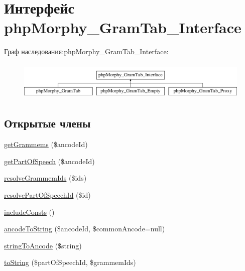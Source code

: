 \hypertarget{interfacephpMorphy__GramTab__Interface}{
\section{Интерфейс phpMorphy\_\-GramTab\_\-Interface}
\label{interfacephpMorphy__GramTab__Interface}
}
Граф наследования:phpMorphy\_\-GramTab\_\-Interface:\begin{figure}[H]
\begin{center}
\leavevmode
\includegraphics[height=1.866667cm]{interfacephpMorphy__GramTab__Interface}
\end{center}
\end{figure}
\subsection*{Открытые члены}
\begin{DoxyCompactItemize}
\item 
\hyperlink{interfacephpMorphy__GramTab__Interface_af2191f54f4a58ea79bd980fc00f2ccaf}{getGrammems} (\$ancodeId)
\item 
\hyperlink{interfacephpMorphy__GramTab__Interface_a8588c3b69fcc065486661ec4a71a6b1c}{getPartOfSpeech} (\$ancodeId)
\item 
\hyperlink{interfacephpMorphy__GramTab__Interface_ab6f68cab39718acf32c4580539d7fa17}{resolveGrammemIds} (\$ids)
\item 
\hyperlink{interfacephpMorphy__GramTab__Interface_a7c440e380d7d26c29951ba5dd2af5256}{resolvePartOfSpeechId} (\$id)
\item 
\hyperlink{interfacephpMorphy__GramTab__Interface_ab1b6b5988b52e4e984f238bf23200469}{includeConsts} ()
\item 
\hyperlink{interfacephpMorphy__GramTab__Interface_a8fce16503f9c28f62a827cdd74b25b36}{ancodeToString} (\$ancodeId, \$commonAncode=null)
\item 
\hyperlink{interfacephpMorphy__GramTab__Interface_a61add1b73b5789a6b5c34f784feeda71}{stringToAncode} (\$string)
\item 
\hyperlink{interfacephpMorphy__GramTab__Interface_a4fc163ef8da2bb73ba1d99795619ef40}{toString} (\$partOfSpeechId, \$grammemIds)
\end{DoxyCompactItemize}


